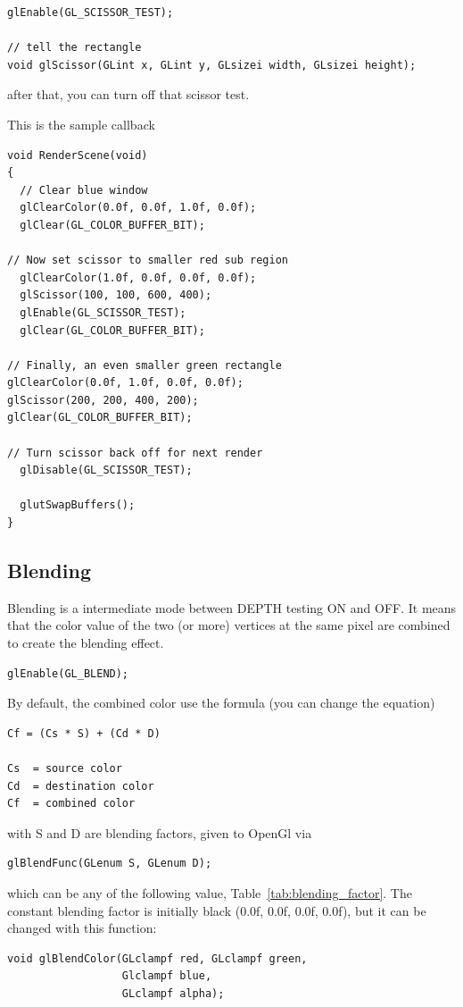 \begin{verbatim}
glEnable(GL_SCISSOR_TEST);

// tell the rectangle
void glScissor(GLint x, GLint y, GLsizei width, GLsizei height);
\end{verbatim}
after that, you can turn off that scissor test.


This is the sample callback
\begin{verbatim}
void RenderScene(void)
{
  // Clear blue window
  glClearColor(0.0f, 0.0f, 1.0f, 0.0f);
  glClear(GL_COLOR_BUFFER_BIT);

// Now set scissor to smaller red sub region
  glClearColor(1.0f, 0.0f, 0.0f, 0.0f);
  glScissor(100, 100, 600, 400);
  glEnable(GL_SCISSOR_TEST);
  glClear(GL_COLOR_BUFFER_BIT);

// Finally, an even smaller green rectangle
glClearColor(0.0f, 1.0f, 0.0f, 0.0f);
glScissor(200, 200, 400, 200);
glClear(GL_COLOR_BUFFER_BIT);

// Turn scissor back off for next render
  glDisable(GL_SCISSOR_TEST);
  
  glutSwapBuffers();
}
\end{verbatim}

\subsection{Blending}
\label{sec:blending}

Blending is a intermediate mode between DEPTH testing ON and OFF. It
means that the color value of the two (or more) vertices at the same
pixel are combined to create the blending effect.

\begin{verbatim}
glEnable(GL_BLEND);
\end{verbatim}

By default, the combined color use the formula (you can change the equation)
\begin{verbatim}
Cf = (Cs * S) + (Cd * D)

Cs  = source color
Cd  = destination color
Cf  = combined color
\end{verbatim}
with S and D are blending factors, given to OpenGl via
\begin{verbatim}
glBlendFunc(GLenum S, GLenum D);
\end{verbatim}
which can be any of the following value,
Table~\ref{tab:blending_factor}. The constant blending factor is
initially black (0.0f, 0.0f, 0.0f, 0.0f), but it can be changed with
this function:
\begin{verbatim}
void glBlendColor(GLclampf red, GLclampf green, 
                  Glclampf blue,
                  GLclampf alpha);
\end{verbatim}

